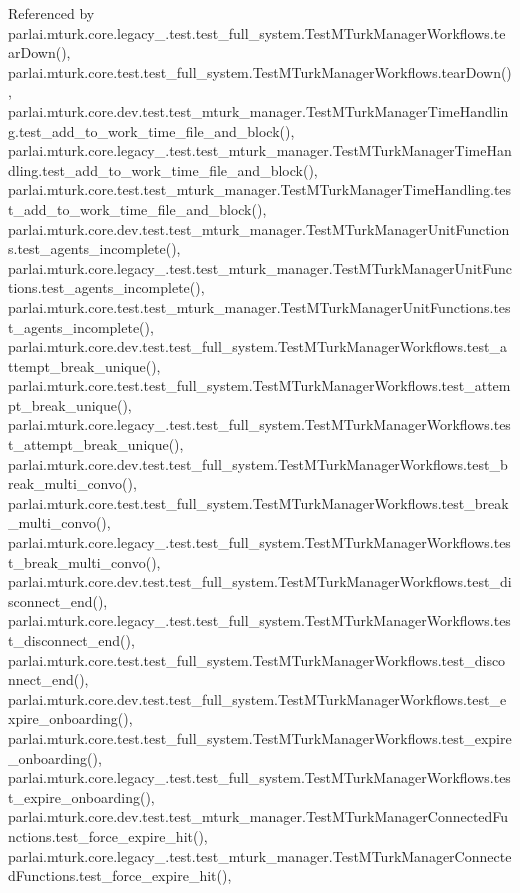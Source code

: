 Referenced by parlai.\+mturk.\+core.\+legacy\+\_.\+test.\+test\+\_\+full\+\_\+system.\+Test\+M\+Turk\+Manager\+Workflows.\+tear\+Down(), parlai.\+mturk.\+core.\+test.\+test\+\_\+full\+\_\+system.\+Test\+M\+Turk\+Manager\+Workflows.\+tear\+Down(), parlai.\+mturk.\+core.\+dev.\+test.\+test\+\_\+mturk\+\_\+manager.\+Test\+M\+Turk\+Manager\+Time\+Handling.\+test\+\_\+add\+\_\+to\+\_\+work\+\_\+time\+\_\+file\+\_\+and\+\_\+block(), parlai.\+mturk.\+core.\+legacy\+\_.\+test.\+test\+\_\+mturk\+\_\+manager.\+Test\+M\+Turk\+Manager\+Time\+Handling.\+test\+\_\+add\+\_\+to\+\_\+work\+\_\+time\+\_\+file\+\_\+and\+\_\+block(), parlai.\+mturk.\+core.\+test.\+test\+\_\+mturk\+\_\+manager.\+Test\+M\+Turk\+Manager\+Time\+Handling.\+test\+\_\+add\+\_\+to\+\_\+work\+\_\+time\+\_\+file\+\_\+and\+\_\+block(), parlai.\+mturk.\+core.\+dev.\+test.\+test\+\_\+mturk\+\_\+manager.\+Test\+M\+Turk\+Manager\+Unit\+Functions.\+test\+\_\+agents\+\_\+incomplete(), parlai.\+mturk.\+core.\+legacy\+\_.\+test.\+test\+\_\+mturk\+\_\+manager.\+Test\+M\+Turk\+Manager\+Unit\+Functions.\+test\+\_\+agents\+\_\+incomplete(), parlai.\+mturk.\+core.\+test.\+test\+\_\+mturk\+\_\+manager.\+Test\+M\+Turk\+Manager\+Unit\+Functions.\+test\+\_\+agents\+\_\+incomplete(), parlai.\+mturk.\+core.\+dev.\+test.\+test\+\_\+full\+\_\+system.\+Test\+M\+Turk\+Manager\+Workflows.\+test\+\_\+attempt\+\_\+break\+\_\+unique(), parlai.\+mturk.\+core.\+test.\+test\+\_\+full\+\_\+system.\+Test\+M\+Turk\+Manager\+Workflows.\+test\+\_\+attempt\+\_\+break\+\_\+unique(), parlai.\+mturk.\+core.\+legacy\+\_.\+test.\+test\+\_\+full\+\_\+system.\+Test\+M\+Turk\+Manager\+Workflows.\+test\+\_\+attempt\+\_\+break\+\_\+unique(), parlai.\+mturk.\+core.\+dev.\+test.\+test\+\_\+full\+\_\+system.\+Test\+M\+Turk\+Manager\+Workflows.\+test\+\_\+break\+\_\+multi\+\_\+convo(), parlai.\+mturk.\+core.\+test.\+test\+\_\+full\+\_\+system.\+Test\+M\+Turk\+Manager\+Workflows.\+test\+\_\+break\+\_\+multi\+\_\+convo(), parlai.\+mturk.\+core.\+legacy\+\_.\+test.\+test\+\_\+full\+\_\+system.\+Test\+M\+Turk\+Manager\+Workflows.\+test\+\_\+break\+\_\+multi\+\_\+convo(), parlai.\+mturk.\+core.\+dev.\+test.\+test\+\_\+full\+\_\+system.\+Test\+M\+Turk\+Manager\+Workflows.\+test\+\_\+disconnect\+\_\+end(), parlai.\+mturk.\+core.\+legacy\+\_.\+test.\+test\+\_\+full\+\_\+system.\+Test\+M\+Turk\+Manager\+Workflows.\+test\+\_\+disconnect\+\_\+end(), parlai.\+mturk.\+core.\+test.\+test\+\_\+full\+\_\+system.\+Test\+M\+Turk\+Manager\+Workflows.\+test\+\_\+disconnect\+\_\+end(), parlai.\+mturk.\+core.\+dev.\+test.\+test\+\_\+full\+\_\+system.\+Test\+M\+Turk\+Manager\+Workflows.\+test\+\_\+expire\+\_\+onboarding(), parlai.\+mturk.\+core.\+test.\+test\+\_\+full\+\_\+system.\+Test\+M\+Turk\+Manager\+Workflows.\+test\+\_\+expire\+\_\+onboarding(), parlai.\+mturk.\+core.\+legacy\+\_.\+test.\+test\+\_\+full\+\_\+system.\+Test\+M\+Turk\+Manager\+Workflows.\+test\+\_\+expire\+\_\+onboarding(), parlai.\+mturk.\+core.\+dev.\+test.\+test\+\_\+mturk\+\_\+manager.\+Test\+M\+Turk\+Manager\+Connected\+Functions.\+test\+\_\+force\+\_\+expire\+\_\+hit(), parlai.\+mturk.\+core.\+legacy\+\_.\+test.\+test\+\_\+mturk\+\_\+manager.\+Test\+M\+Turk\+Manager\+Connected\+Functions.\+test\+\_\+force\+\_\+expire\+\_\+hit(), 